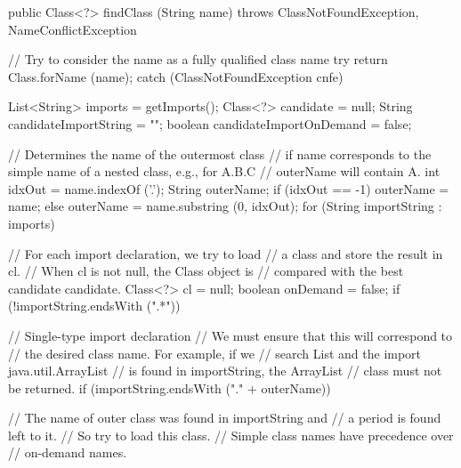 \begin{code}

   public Class<?> findClass (String name) throws
      ClassNotFoundException, NameConflictException\begin{hide} {
      // Try to consider the name as a fully qualified class name
      try {
         return Class.forName (name);
      }
      catch (ClassNotFoundException cnfe) {}

      List<String> imports = getImports();
      Class<?> candidate = null;
      String candidateImportString = "";
      boolean candidateImportOnDemand = false;

      // Determines the name of the outermost class
      // if name corresponds to the simple name of a nested class, e.g., for A.B.C
      // outerName will contain A.
      int idxOut = name.indexOf ('.');
      String outerName;
      if (idxOut == -1)
         outerName = name;
      else
         outerName = name.substring (0, idxOut);
      for (String importString : imports) {
         // For each import declaration, we try to load
         // a class and store the result in cl.
         // When cl is not null, the Class object is
         // compared with the best candidate candidate.
         Class<?> cl = null;
         boolean onDemand = false;
         if (!importString.endsWith (".*")) {
            // Single-type import declaration
            // We must ensure that this will correspond to
            // the desired class name. For example, if we
            // search List and the import java.util.ArrayList
            // is found in importString, the ArrayList
            // class must not be returned.
            if (importString.endsWith ("." + outerName)) {
               // The name of outer class was found in importString and
               // a period is found left to it.
               // So try to load this class.
               // Simple class names have precedence over
               // on-demand names.

}}}}
\end{hide}
\end{code}
